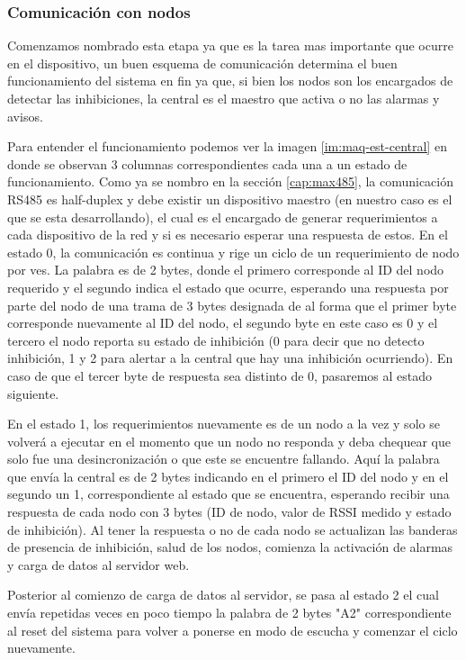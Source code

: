 \subsubsection{Comunicación con nodos}
\par Comenzamos nombrado esta etapa ya que es la tarea mas importante que ocurre en el dispositivo, un buen esquema de comunicación determina el buen funcionamiento del sistema en fin ya que, si bien los nodos son los encargados de detectar las inhibiciones, la central es el maestro que activa o no las alarmas y avisos. 
\par Para entender el funcionamiento podemos ver la imagen \ref{im:maq-est-central} en donde se observan 3 columnas correspondientes cada una a un estado de funcionamiento.
Como ya se nombro en la sección \ref{cap:max485}, la comunicación RS485 es half-duplex y debe existir un dispositivo maestro (en nuestro caso es el que se esta desarrollando), el cual es el encargado de generar requerimientos a cada dispositivo de la red y si es necesario esperar una respuesta de estos. 
En el estado 0, la comunicación es continua y rige un ciclo de un requerimiento de nodo por ves. La palabra es de 2 bytes, donde el primero corresponde al ID del nodo requerido y el segundo indica el estado que ocurre, esperando una respuesta por parte del nodo de una trama de 3 bytes designada de al forma que el primer byte corresponde nuevamente al ID del nodo, el segundo byte en este caso es 0 y el tercero el nodo reporta su estado de inhibición (0 para decir que no detecto inhibición, 1 y 2 para alertar a la central que hay una inhibición ocurriendo). En caso de que el tercer byte de respuesta sea distinto de 0, pasaremos al estado siguiente.
\par En el estado 1, los requerimientos nuevamente es de un nodo a la vez y solo se volverá a ejecutar en el momento que un nodo no responda y deba chequear que solo fue una desincronización o que este se encuentre fallando. Aquí la palabra que envía la central es de 2 bytes indicando en el primero el ID del nodo y en el segundo un 1, correspondiente al estado que se encuentra, esperando recibir una respuesta de cada nodo con 3 bytes (ID de nodo, valor de RSSI medido y estado de inhibición). Al tener la respuesta o no de cada nodo se actualizan las banderas de presencia de inhibición, salud de los nodos, comienza la activación de alarmas y carga de datos al servidor web. 
\par Posterior al comienzo de carga de datos al servidor, se pasa al estado 2 el cual envía repetidas veces en poco tiempo la palabra de 2 bytes "A2" correspondiente al reset del sistema para volver a ponerse en modo de escucha y comenzar el ciclo nuevamente. 

